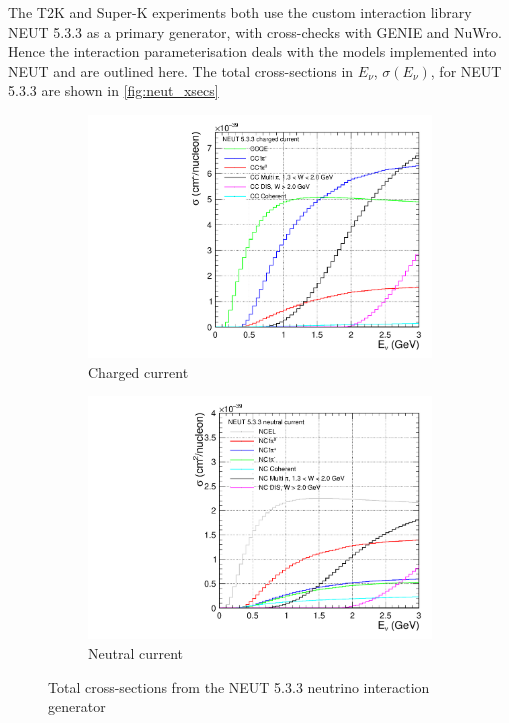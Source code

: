 The T2K and Super-K experiments both use the custom interaction library NEUT 5.3.3\cite{neut} as a primary generator, with cross-checks with GENIE\cite{genie} and NuWro\cite{NuWro}. Hence the interaction parameterisation deals with the models implemented into NEUT and are outlined here. The total cross-sections in $E_\nu$, $\sigma(E_\nu)$, for NEUT 5.3.3 are shown in \autoref{fig:neut_xsecs}

\begin{figure}[h]
	\centering
	\begin{subfigure}[t]{0.42\textwidth}
		\includegraphics[width=\textwidth, trim={0mm 0mm 0mm 0mm}, clip,page=1]{figures/niwg/NEUT_533_xsecs}
		\caption{Charged current}
	\end{subfigure}
	\begin{subfigure}[t]{0.42\textwidth}
		\includegraphics[width=\textwidth, trim={0mm 0mm 0mm 0mm}, clip,page=1]{figures/niwg/NEUT_533_xsecs_NC}
		\caption{Neutral current}
	\end{subfigure}
	\caption{Total cross-sections from the NEUT 5.3.3\cite{neut} neutrino interaction generator}
	\label{fig:neut_xsecs}
\end{figure}

